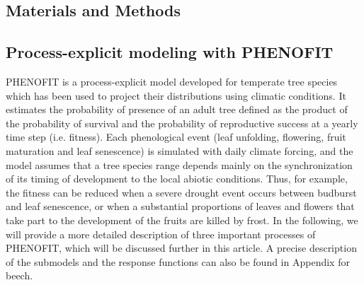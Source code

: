 \documentclass[letterpaper,8pt]{extarticle}  %
\begin{document}
\begin{doublespacing}
\begin{linenumbers}





\section{Materials and Methods}

\subsection{Process-explicit modeling with PHENOFIT}

PHENOFIT is a process-explicit model developed for temperate tree species which has been used to project their distributions using climatic conditions. It estimates the probability of presence of an adult tree defined as the product of the probability of survival and the probability of reproductive success at a yearly time step (i.e. fitness). 
Each phenological event (leaf unfolding, flowering, fruit maturation and leaf senescence) is simulated with daily climate forcing, and the model assumes that a tree species range depends mainly on the synchronization of its timing of development to the local abiotic conditions. Thus, for example, the fitness can be reduced when a severe drought event occurs between budburst and leaf senescence, or when a substantial proportions of leaves and flowers that take part to the development of the fruits are killed by frost. In the following, we will provide a more detailed description of three important processes of PHENOFIT, which will be discussed further in this article. A precise description of the submodels and the response functions can also be found in Appendix for beech.


\end{linenumbers}
\end{doublespacing}
\end{document}
